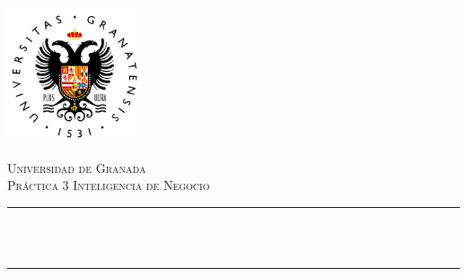 \begin{titlepage}

\newcommand{\HRule}{\rule{\linewidth}{0.5mm}} %



\includegraphics[width = 4cm]{../notebooks/figures/ugr}\\[0.5cm] 

\center %


\textsc{\Large Universidad de Granada}\\[0.5cm] 
\textsc{\large Práctica 3 Inteligencia de Negocio}\\[0.5cm] 


\HRule \\[0.4cm]
{ \huge \bfseries \reporttitle}\\ %
\HRule \\[1.5cm]
 

\begin{minipage}{0.4\textwidth}
\begin{flushleft} \large
\reportauthor %
\end{flushleft}
\end{minipage}
~


\vfill %
\labgroup\\
\email\\
\degreetype\\[0.5cm]

\makeatletter
\@date 
\makeatother


\end{titlepage}
